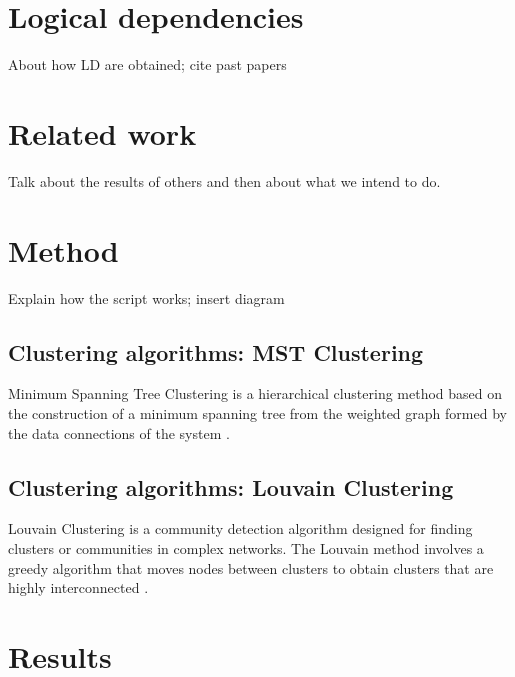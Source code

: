 \documentclass[conference]{IEEEtran}
\begin{document}
\section{Logical dependencies}

About how LD are obtained; cite past papers

\section{Related work}

Talk about the results of others and then about what we intend to do.


\section{Method}
Explain how the script works; insert diagram 

\subsection{Clustering algorithms: MST Clustering}
Minimum Spanning Tree Clustering is a hierarchical clustering method based on the construction of a minimum spanning tree from the weighted graph formed by the data connections of the system \cite{mst_clustering}.


\subsection{Clustering algorithms: Louvain Clustering}
Louvain Clustering is a community detection algorithm designed for finding clusters or communities in complex networks. The Louvain method involves a greedy algorithm that moves nodes between clusters to obtain clusters that are highly interconnected \cite{louvain_clustering}.


\section{Results}
\end{document}
